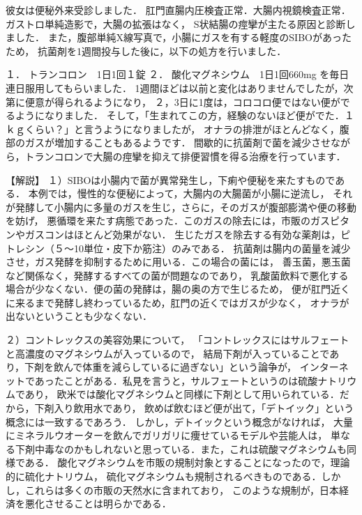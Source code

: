 彼女は便秘外来受診しました．
肛門直腸内圧検査正常．大腸内視鏡検査正常．ガストロ単純造影で，大腸の拡張はなく，
S状結腸の痙攣が主たる原因と診断しました．
また，腹部単純X線写真で，小腸にガスを有する軽度のSIBOがあったため， 
抗菌剤を1週間投与した後に，以下の処方を行いました．


１． トランコロン　1日1回１錠
２． 酸化マグネシウム　1日1回660mg
を毎日連日服用してもらいました．
1週間ほどは以前と変化はありませんでしたが，次第に便意が得られるようになり，
２，3日に1度は，コロコロ便ではない便がでるようになりました．
そして，「生まれてこの方，経験のないほど便がでた．１ｋｇくらい？」と言うようになりましたが，
オナラの排泄がほとんどなく，腹部のガスが増加することもあるようです．
間歇的に抗菌剤で菌を減少させながら，トランコロンで大腸の痙攣を抑えて排便習慣を得る治療を行っています． 



【解説】
１）SIBOは小腸内で菌が異常発生し，下痢や便秘を来たすものである．
本例では，慢性的な便秘によって，大腸内の大腸菌が小腸に逆流し，
それが発酵して小腸内に多量のガスを生じ，さらに，そのガスが腹部膨満や便の移動を妨げ，
悪循環を来たす病態であった．このガスの除去には，市販のガスピタンやガスコンはほとんど効果がない．
生じたガスを除去する有効な薬剤は，ピトレシン（５～10単位・皮下か筋注）のみである．
抗菌剤は腸内の菌量を減少させ，ガス発酵を抑制するために用いる．この場合の菌には，
善玉菌，悪玉菌など関係なく，発酵するすべての菌が問題なのであり，
乳酸菌飲料で悪化する場合が少なくない．便の菌の発酵は，腸の奥の方で生じるため，
便が肛門近くに来るまで発酵し終わっているため，肛門の近くではガスが少なく，
オナラが出ないということも少なくない．

２）コントレックスの美容効果について，
「コントレックスにはサルフェートと高濃度のマグネシウムが入っているので，
結局下剤が入っていることであり，下剤を飲んで体重を減らしているに過ぎない」という論争が，
インターネットであったことがある．私見を言うと，サルフェートというのは硫酸ナトリウムであり，
欧米では酸化マグネシウムと同様に下剤として用いられている．だから，下剤入り飲用水であり，
飲めば飲むほど便が出て，「デトイック」という概念には一致するであろう．
しかし，デトイックという概念がなければ，
大量にミネラルウオーターを飲んでガリガリに痩せているモデルや芸能人は，
単なる下剤中毒なのかもしれないと思っている．また，これは硫酸マグネシウムも同様である．
酸化マグネシウムを市販の規制対象とすることになったので，理論的に硫化ナトリウム，
硫化マグネシウムも規制されるべきものである．しかし，これらは多くの市販の天然水に含まれており，
このような規制が，日本経済を悪化させることは明らかである．


